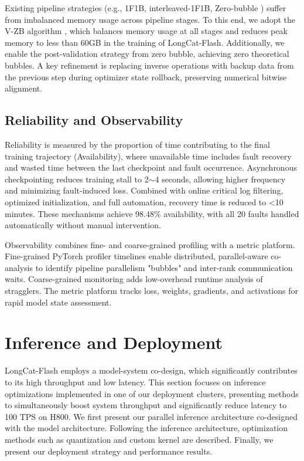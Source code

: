 \documentclass{article}
\newcommand{\longcat}{LongCat-Flash\xspace}
\begin{document}
Existing pipeline strategies (e.g., 1F1B, interleaved-1F1B, Zero-bubble \citep{qi2023zero}) suffer from imbalanced memory usage across pipeline stages. To this end, we adopt the V-ZB algorithm \citep{qi2024zbv}, which balances memory usage at all stages and reduces peak memory to less than 60GB in the training of \longcat. Additionally, we enable the post-validation strategy from zero bubble, achieving zero theoretical bubbles. A key refinement is replacing inverse operations with backup data from the previous step during optimizer state rollback, preserving numerical bitwise alignment.

\subsection{Reliability and Observability}
Reliability is measured by the proportion of time contributing to the final training trajectory (Availability), where unavailable time includes fault recovery and wasted time between the last checkpoint and fault occurrence. Asynchronous checkpointing reduces training stall to 2$\sim$4 seconds, allowing higher frequency and minimizing fault-induced loss. Combined with online critical log filtering, optimized initialization, and full automation, recovery time is reduced to <10 minutes. These mechanisms achieve 98.48\% availability, with all 20 faults handled automatically without manual intervention.

Observability combines fine- and coarse-grained profiling with a metric platform. Fine-grained PyTorch profiler timelines enable distributed, parallel-aware co-analysis to identify pipeline parallelism "bubbles" and inter-rank communication waits. Coarse-grained monitoring adds low-overhead runtime analysis of stragglers. The metric platform tracks loss, weights, gradients, and activations for rapid model state assessment.

\section{Inference and Deployment}


\longcat employs a model-system co-design, which significantly contributes to its high throughput and low latency. This section focuses on inference optimizations implemented in one of our deployment clusters, presenting methods to simultaneously boost system throughput and significantly reduce latency to 100 TPS on H800. We first present our parallel inference architecture co-designed with the model architecture. Following the inference architecture, optimization methods such as quantization and custom kernel are described. Finally, we present our deployment strategy and performance results.
\end{document}
